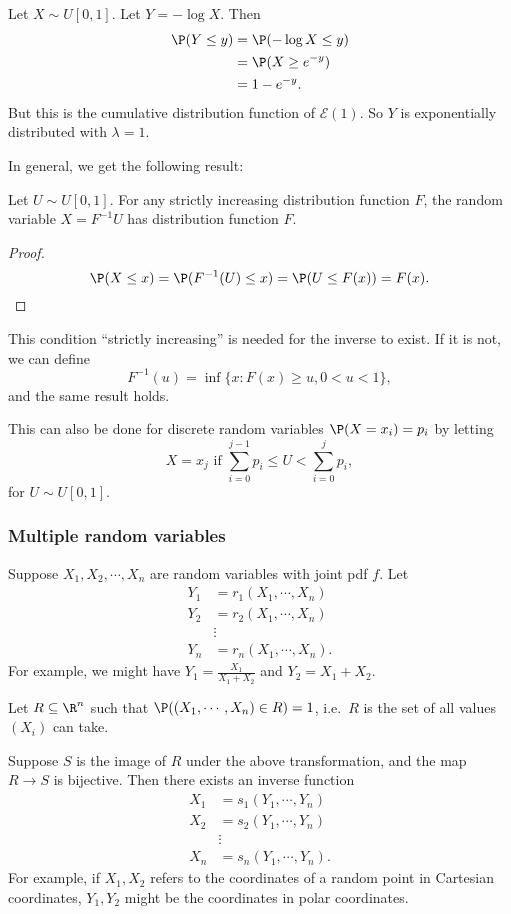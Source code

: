 \documentclass[a4paper]{article}
\begin{document}
\begin{eg}
  Let $X\sim U[0, 1]$. Let $Y = -\log X$. Then
  \begin{align*}
    \P(Y \leq y) &= \P(-\log X \leq y)\\
    &= \P(X \geq e^{-y})\\
    &= 1 - e^{-y}.
  \end{align*}
  But this is the cumulative distribution function of $\mathcal{E}(1)$. So $Y$ is exponentially distributed with $\lambda = 1$.
\end{eg}

In general, we get the following result:
\begin{thm}
  Let $U\sim U[0, 1]$. For any strictly increasing distribution function $F$, the random variable $X = F^{-1}U$ has distribution function $F$.
\end{thm}

\begin{proof}
  \[
    \P(X \leq x) = \P(F^{-1}(U) \leq x) = \P(U \leq F(x)) = F(x).\qedhere
  \]
\end{proof}
This condition ``strictly increasing'' is needed for the inverse to exist. If it is not, we can define
\[
  F^{-1}(u) = \inf\{x: F(x)\geq u, 0 < u < 1\},
\]
and the same result holds.

This can also be done for discrete random variables $\P(X = x_i) = p_i$ by letting
\[
  X = x_j\text{ if }\sum_{i = 0}^{j - 1}p_i \leq U < \sum_{i = 0}^j p_i,
\]
for $U\sim U[0, 1]$.

\subsubsection*{Multiple random variables}
Suppose $X_1, X_2, \cdots, X_n$ are random variables with joint pdf $f$. Let
\begin{align*}
  Y_1 &= r_1(X_1, \cdots, X_n)\\
  Y_2 &= r_2(X_1, \cdots, X_n)\\
  &\vdots \\
  Y_n &= r_n(X_1, \cdots, X_n).
\end{align*}
For example, we might have $Y_1 = \frac{X_1}{X_1 + X_2}$ and $Y_2 = X_1 + X_2$.

Let $R\subseteq \R^n$ such that $\P((X_1, \cdots, X_n)\in R) = 1$, i.e.\ $R$ is the set of all values $(X_i)$ can take.

Suppose $S$ is the image of $R$ under the above transformation, and the map $R\to S$ is bijective. Then there exists an inverse function
\begin{align*}
  X_1 &= s_1(Y_1, \cdots, Y_n)\\
  X_2 &= s_2(Y_1, \cdots, Y_n)\\
  &\vdots\\
  X_n &= s_n(Y_1, \cdots, Y_n).
\end{align*}
For example, if $X_1, X_2$ refers to the coordinates of a random point in Cartesian coordinates, $Y_1, Y_2$ might be the coordinates in polar coordinates.
\end{document}
